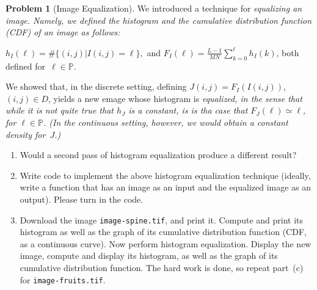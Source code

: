 \documentclass[11pt]{article}
\theoremstyle{plain}
\theoremstyle{definition}
\newtheorem{problem}{Problem}
\theoremstyle{remark}
\begin{document}
\begin{problem}[Image Equalization]
We introduced a technique for \em equalizing \em
an image. Namely,
we defined the \em histogram \em 
and the cumulative distribution function
(CDF) of an image as follows:
\par\vspace{.1cm}
\hfill
$h_I(\ell)=\#\big\{
(i,j)\big|I(i,j)=\ell
\big\},$
\hfill
and\hfill
$\displaystyle
F_I(\ell)
=\frac{L-1}{MN}\sum_{k=0}^{\ell}h_I(k)$,
\hfill
both defined for~$\ell\in\mathbb{P}$.
\hfill\mbox{ }
\par\vspace{.1cm}
We showed that, in the discrete setting, %
defining %
$J(i,j)=F_I(I(i,j))$, $(i,j)\in D$,
yields a new emage whose histogram is 
\em equalized\em\/, in the sense
that while it is not quite true that $h_J$
is a constant, is is tha case that
$F_J(\ell)\simeq\ell$, for $\ell\in\mathbb{P}$.
(In the continuous setting, however, we would obtain a constant 
density for~$J$.)
\begin{enumerate}[\hspace{.25cm}\bf(a)]
	\item Would a second pass of histogram equalization produce a different result?
	\item Write code to implement the above histogram equalization technique (ideally, write a function that has an image as an input
	and the equalized image as an output). 
	Please turn in the code.
	\item Download the image \verb+image-spine.tif+,
	and print it.
	Compute and print its histogram as well as the graph 
	of its cumulative distribution function
	(CDF, as a continuous curve). 
	Now perform histogram equalization.
	Display the new image, compute and display 
	its histogram, as well as the graph 
	of its cumulative distribution function.
	The hard work is done, 
	so repeat part~(c) for \verb+image-fruits.tif+.
	
\end{enumerate}
\end{problem}
\end{document}
